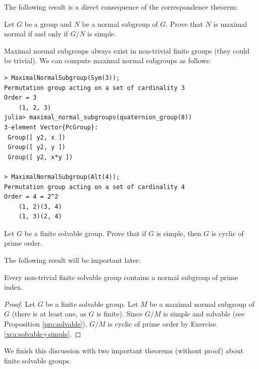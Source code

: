 The following result is a direct consequence of the correspondence theorem:

\begin{exercise}
\label{xca:G/N_simple}
    Let $G$ be a group and $N$ be a normal subgroup of $G$. Prove that 
    $N$ is maximal normal if and only if $G/N$ is simple. 
\end{exercise}

Maximal normal subgroups always exist in non-trivial finite groups (they could be trivial). 
We can compute maximal normal subgroups as follows:
\begin{lstlisting}
> MaximalNormalSubgroup(Sym(3));
Permutation group acting on a set of cardinality 3
Order = 3
    (1, 2, 3)
julia> maximal_normal_subgroups(quaternion_group(8))
3-element Vector{PcGroup}:
 Group([ y2, x ])
 Group([ y2, y ])
 Group([ y2, x*y ])

> MaximalNormalSubgroup(Alt(4));
Permutation group acting on a set of cardinality 4
Order = 4 = 2^2
    (1, 2)(3, 4)
    (1, 3)(2, 4)
\end{lstlisting}


\begin{exercise}
\label{xca:solvable+simple}
    Let $G$ be a 
    finite solvable group. Prove that if $G$ is simple, then 
    $G$ is cyclic of prime order. 
\end{exercise}

The following result will be important later:

\begin{proposition}
\label{pro:prime_index}
    Every non-trivial finite solvable group contains a normal subgroup of prime index. 
\end{proposition}

\begin{proof}
    Let $G$ be a finite solvable group. 
    Let $M$ be a maximal normal subgroup of $G$ (there is at least one, as $G$ is finite). 
    Since $G/M$ is simple and solvable (see Proposition \ref{pro:solvable}), 
    $G/M$ is cyclic of prime order by Exercise \ref{xca:solvable+simple}.  
\end{proof}

We finish this discussion with two important theorems (without proof) 
about finite solvable groups. 

